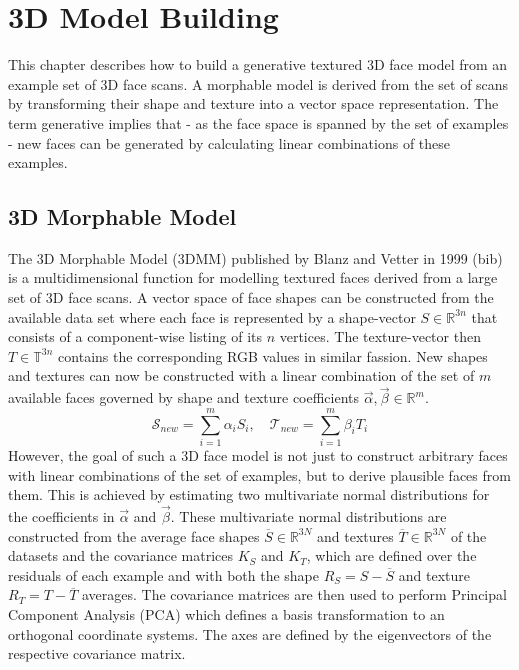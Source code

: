 \chapter{3D Model Building}
This chapter describes how to build a generative textured 3D face model from an example set of 3D face scans. A morphable model is derived from the set of scans by transforming their shape and texture into a vector space representation. The term generative implies that - as the face space is spanned by the set of examples - new faces can be generated by calculating linear combinations of these examples. 

\section{3D Morphable Model}
The 3D Morphable Model (3DMM) published by Blanz and Vetter in 1999 (bib) is a multidimensional function for modelling textured faces derived from a large set of 3D face scans. 
A vector space of face shapes can be constructed from the available data set where each face is represented by a shape-vector $S \in \mathbb{R}^{3n}$ that consists of a component-wise listing of its $n$ vertices. The texture-vector then $T \in
\mathbb{T}^{3n}$ contains the corresponding RGB values in similar fassion.
New shapes and textures can now be constructed with a linear combination of the set of $m$ available faces governed by shape and texture coefficients $\vec\alpha, \vec\beta \in \mathbb{R}^{m}$.
\begin{equation}
\label{eq:MM}
\mathcal{S}_{new}=\sum_{i=1}^{m}\alpha_{i}S_{i}, \quad \mathcal{T}_{new}=\sum_{i=1}^{m}\beta_{i}T_{i}
\end{equation}
However, the goal of such a 3D face model is not just to construct arbitrary faces with linear combinations of the set of examples, but to derive plausible faces from them. This is achieved by estimating two multivariate normal distributions for the coefficients in $\vec\alpha$ and $\vec\beta$.
These multivariate normal distributions are constructed from the average face shapes $\overline{S} \in \mathbb{R}^{3N}$ and textures $\overline{T} \in \mathbb{R}^{3N}$ of the datasets and the covariance matrices $K_{S}$ and $K_{T}$, which are defined over the residuals of each example and with both the shape $R_{S}=S-\overline{S}$ and texture $R_{T}=T-\overline{T}$ averages. The covariance matrices are then used to perform Principal Component Analysis (PCA)
which defines a basis transformation to an orthogonal coordinate systems. The axes are defined by the eigenvectors of the respective covariance matrix.
